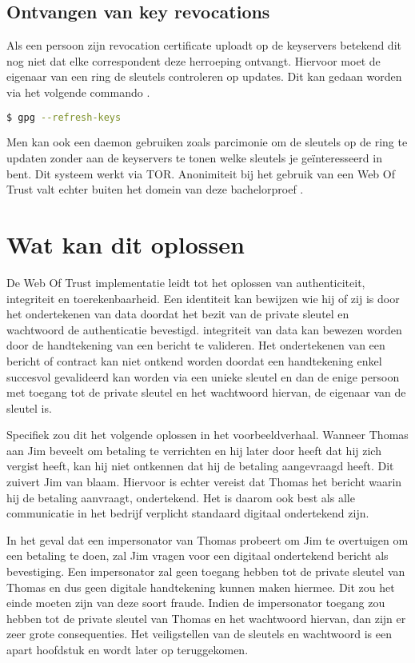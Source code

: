\subsection{Ontvangen van key revocations}
\label{subsec:ontvangen-van-key-revocations}

Als een persoon zijn revocation certificate uploadt op de keyservers betekend
dit nog niet dat elke correspondent deze herroeping ontvangt. Hiervoor moet de
eigenaar van een ring de sleutels controleren op updates. Dit kan gedaan worden
via het volgende commando \autocite{GnuPGFAQ}.

\begin{lstlisting}[language=bash]
$ gpg --refresh-keys
\end{lstlisting}

Men kan ook een daemon gebruiken zoals parcimonie om de sleutels op de ring te
updaten zonder aan de keyservers te tonen welke sleutels je geïnteresseerd in
bent. Dit systeem werkt via \gls{TOR}. Anonimiteit bij het gebruik van een Web Of
Trust valt echter buiten het domein van deze bachelorproef
\autocite{RiseUpOpenPGPBestPractices}.

\section{Wat kan dit oplossen}
\label{sec:wat-kan-dit-oplossen}

De Web Of Trust implementatie leidt tot het oplossen van \gls{authenticiteit},
\gls{integriteit} en \gls{toerekenbaarheid}. Een identiteit kan bewijzen wie hij of
zij is
door het ondertekenen van data doordat het bezit van de private sleutel en
wachtwoord de authenticatie bevestigd. \Gls{integriteit} van data kan bewezen
worden
door de handtekening van een bericht te valideren. Het ondertekenen van een
bericht of contract kan niet ontkend worden doordat een handtekening enkel
succesvol gevalideerd kan worden via een unieke sleutel en dan de enige persoon
met toegang tot de private sleutel en het wachtwoord hiervan, de eigenaar van de
sleutel is.

Specifiek zou dit het volgende oplossen in het voorbeeldverhaal. Wanneer Thomas
aan Jim beveelt om betaling te verrichten en hij later door heeft dat hij zich
vergist heeft, kan hij niet ontkennen dat hij de betaling aangevraagd heeft. Dit
zuivert Jim van blaam. Hiervoor is echter vereist dat Thomas het bericht waarin
hij de betaling aanvraagt, ondertekend. Het is daarom ook best als alle
communicatie in het bedrijf verplicht standaard digitaal ondertekend zijn.

In het geval dat een impersonator van Thomas probeert om Jim te overtuigen om
een betaling te doen, zal Jim vragen voor een digitaal ondertekend bericht als
bevestiging. Een impersonator zal geen toegang hebben tot de private sleutel van
Thomas en dus geen digitale handtekening kunnen maken hiermee. Dit zou het einde
moeten zijn van deze soort fraude. Indien de impersonator toegang zou hebben tot
de private sleutel van Thomas en het wachtwoord hiervan, dan zijn er zeer grote
consequenties. Het veiligstellen van de sleutels en wachtwoord is een apart
hoofdstuk en wordt later op teruggekomen.

